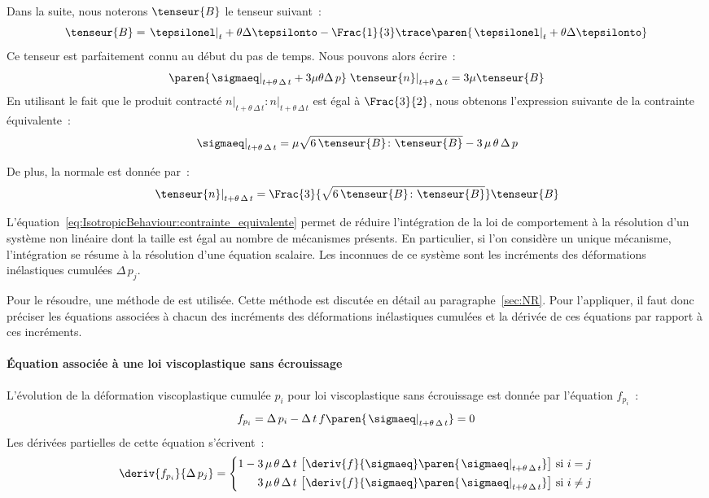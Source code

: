 \documentclass[rectoverso,pleiades,pstricks,leqno,anti]{texmf/note_technique_2010}
\newcommand{\debutpas}[1]{\ensuremath{\left.#1\right|_{t}}}
\newcommand{\milieupas}[1]{\ensuremath{\left.#1\right|_{t+\theta\, \Delta\, t}}}
\begin{document}
Dans la suite, nous noterons \(\tenseur{B}\) le tenseur suivant~:
\[
\tenseur{B}=\debutpas{\tepsilonel}+\theta\Delta\tepsilonto-\Frac{1}{3}\trace\paren{\debutpas{\tepsilonel}+\theta\Delta\tepsilonto}
\]
Ce tenseur est parfaitement connu au début du pas de temps. Nous pouvons
alors écrire~:
\[
\paren{\milieupas{\sigmaeq}+3\mu\theta\Delta\,p}\milieupas{\tenseur{n}}=3\mu\tenseur{B}
\]
En utilisant le fait que le produit contracté
\(\milieupas{n}\colon\milieupas{n}\) est égal à
\(\Frac{3}{2}\), nous obtenons
l'expression suivante de la contrainte équivalente~:
\begin{equation}
  \label{eq:IsotropicBehaviour:contrainte_equivalente}
  \milieupas{\sigmaeq}=\mu\sqrt{6\,\tenseur{B}\colon\tenseur{B}}-3\,\mu\,\theta\,\Delta\,p
\end{equation}

De plus, la normale est donnée par~:
\begin{equation}
  \label{eq:IsotropicBehaviour:normale}
  \milieupas{\tenseur{n}}=\Frac{3}{\sqrt{6\,\tenseur{B}\colon\tenseur{B}}}\tenseur{B}
\end{equation}

L'équation~\eqref{eq:IsotropicBehaviour:contrainte_equivalente} permet
de réduire l'intégration de la loi de comportement à la résolution d'un
système non linéaire dont la taille est égal au nombre de mécanismes
présents. En particulier, si l'on considère un unique mécanisme,
l'intégration se résume à la résolution d'une équation scalaire. Les
inconnues de ce système sont les incréments des déformations
inélastiques cumulées \(\Delta\, p_{j}\).

Pour le résoudre, une méthode de  est utilisée.
Cette méthode est discutée en détail au paragraphe~\ref{sec:NR}. Pour
l'appliquer, il faut donc préciser les équations associées à chacun des
incréments des déformations inélastiques cumulées et la dérivée de ces
équations par rapport à ces incréments.

\paragraph{Équation associée à une loi viscoplastique sans écrouissage}
L'évolution de la déformation viscoplastique cumulée \(p_{i}\) pour loi
viscoplastique sans écrouissage est donnée par l'équation \(f_{p_{i}}\)~:
\[
f_{p_{i}} = \Delta\,p_{i}-\Delta\,t\,f\paren{\milieupas{\sigmaeq}}=0
\]
Les dérivées partielles de cette équation s'écrivent~:
\[
\deriv{f_{p_{i}}}{\Delta\, p_{j}}=
\left\{
\begin{aligned}
1-3\,\mu\,\theta\,\Delta\,t\,\left[\deriv{f}{\sigmaeq}\paren{\milieupas{\sigmaeq}}\right] & \text{ si } i=j \\
3\,\mu\,\theta\,\Delta\,t\,\left[\deriv{f}{\sigmaeq}\paren{\milieupas{\sigmaeq}}\right] & \text{ si } i\neq j
\end{aligned}
\right.
\]
\end{document}
